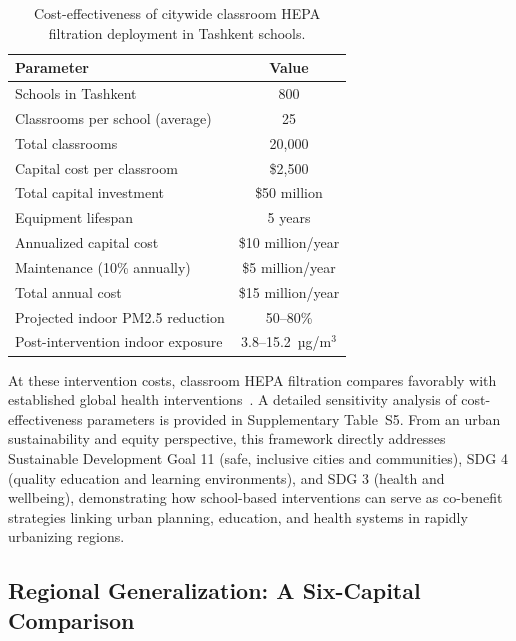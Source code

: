 \documentclass[11pt,a4paper]{article}
\begin{document}
\begin{table}[H]
\centering
\caption{Cost-effectiveness of citywide classroom HEPA filtration deployment in Tashkent schools.}
\label{tab:cost}
\begin{tabular}{lc}
\toprule
Parameter & Value \\
\midrule
Schools in Tashkent & 800 \\
Classrooms per school (average) & 25 \\
Total classrooms & 20,000 \\
Capital cost per classroom & \$2,500 \\
Total capital investment & \$50 million \\
Equipment lifespan & 5 years \\
Annualized capital cost & \$10 million/year \\
Maintenance (10\% annually) & \$5 million/year \\
Total annual cost & \$15 million/year \\
\addlinespace
Projected indoor PM2.5 reduction & 50--80\% \\
Post-intervention indoor exposure & 3.8--15.2~µg/m$^3$ \\
\bottomrule
\end{tabular}
\end{table}

At these intervention costs, classroom HEPA filtration compares favorably with established global health interventions~\cite{jamison2017disease,allen2016associations}. A detailed sensitivity analysis of cost-effectiveness parameters is provided in Supplementary Table~S5. From an urban sustainability and equity perspective, this framework directly addresses Sustainable Development Goal 11 (safe, inclusive cities and communities), SDG 4 (quality education and learning environments), and SDG 3 (health and wellbeing), demonstrating how school-based interventions can serve as co-benefit strategies linking urban planning, education, and health systems in rapidly urbanizing regions.

\subsection{Regional Generalization: A Six-Capital Comparison}
\end{document}
